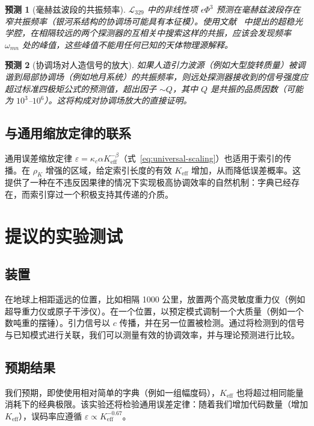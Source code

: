 \documentclass[12pt,a4paper]{article}
\newcommand{\Keff}{K_{\mathrm{eff}}}
\newcommand{\kappac}{\kappa_c}
\newcommand{\eps}{\varepsilon}
\newtheorem{prediction}{预测}
\begin{document}
	\begin{prediction}[毫赫兹波段的共振频率]
		\(\mathcal{L}_{329}\) 中的非线性项 \(\epsilon \Phi^3\) 预测在毫赫兹波段存在窄共振频率（银河系结构的协调场可能具有本征模）。使用文献~\cite{Barontini2025} 中提出的超稳光学腔，在相隔较远的两个探测器的互相关中搜索这样的共振，应该会发现频率 \(\omega_{mn}\) 处的峰值，这些峰值不能用任何已知的天体物理源解释。
	\end{prediction}
	
	\begin{prediction}[协调场对人造信号的放大]
		如果人造引力波源（例如大型旋转质量）被调谐到局部协调场（例如地月系统）的共振频率，则远处探测器接收到的信号强度应超过标准四极矩公式的预测值，超出因子 \(\sim Q\)，其中 \(Q\) 是共振的品质因数（可能为 \(10^3\)–\(10^6\)）。这将构成对协调场放大的直接证明。
	\end{prediction}
	
	\subsection{与通用缩放定律的联系}
	
	通用误差缩放定律 \(\eps = \kappac\alpha\Keff^{-\beta}\)（式~\ref{eq:universal-scaling}）也适用于索引的传播。在 \(\rho_K\) 增强的区域，给定索引长度的有效 \(\Keff\) 增加，从而降低误差概率。这提供了一种在不违反因果律的情况下实现极高协调效率的自然机制：字典已经存在，而索引穿过一个积极支持其传递的介质。
	
	\section{提议的实验测试}
	\label{sec:experiment}
	
	\subsection{装置}
	
	在地球上相距遥远的位置，比如相隔 1000 公里，放置两个高灵敏度重力仪（例如超导重力仪或原子干涉仪）。在一个位置，以预定模式调制一个大质量（例如一个数吨重的摆锤）。引力信号以 \(c\) 传播，并在另一位置被检测。通过将检测到的信号与已知模式进行关联，我们可以测量有效的协调效率，并与理论预测进行比较。
	
	\subsection{预期结果}
	
	我们预期，即使使用相对简单的字典（例如一组幅度码），\(\Keff\) 也将超过相同能量消耗下的经典极限。该实验还将检验通用误差定律：随着我们增加代码数量（增加 \(\Keff\)），误码率应遵循 \(\eps \propto \Keff^{-0.67}\)。
	
\end{document}
